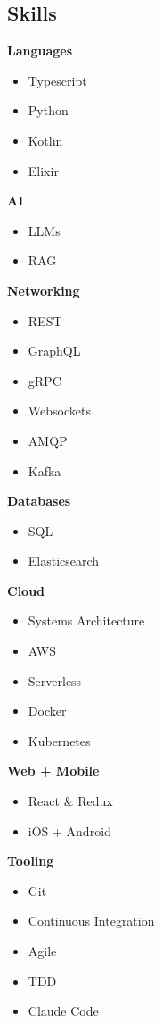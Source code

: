 \documentclass[11pt]{article}
\newcommand{\skillcategory}[1]{%
      {\bfseries #1}
      \vspace{-6pt}
  }
\begin{document}
\begin{paracol}{2}
\begin{leftcolumn}
\section{Skills}
\skillcategory{Languages}
\begin{itemize}
    \item Typescript
    \item Python
    \item Kotlin
    \item Elixir
\end{itemize}
\skillcategory{AI}
\begin{itemize}
    \item LLMs
    \item RAG
\end{itemize}
\skillcategory{Networking}
\begin{itemize}
    \item REST
    \item GraphQL
    \item gRPC
    \item Websockets
    \item AMQP
    \item Kafka
\end{itemize}
\skillcategory{Databases}
\begin{itemize}
    \item SQL
    \item Elasticsearch
\end{itemize}
\skillcategory{Cloud}
\begin{itemize}
    \item Systems Architecture
    \item AWS
    \item Serverless
    \item Docker
    \item Kubernetes
\end{itemize}
\skillcategory{Web + Mobile}
\begin{itemize}
    \item React \& Redux
    \item iOS + Android
\end{itemize}
\skillcategory{Tooling}
\begin{itemize}
    \item Git
    \item Continuous Integration
    \item Agile
    \item TDD
    \item Claude Code
\end{itemize}
\end{leftcolumn}


\end{paracol}
\end{document}
